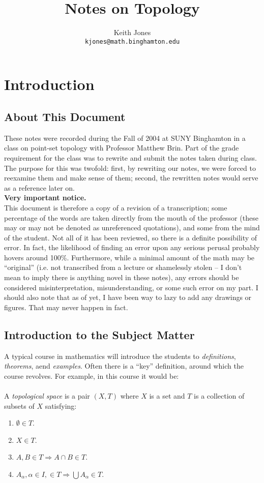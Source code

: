 \documentclass[12pt]{report}
\title{
Notes on Topology
}
\author{
    Keith Jones\\
    {\tt kjones@math.binghamton.edu}\\
}
\newcommand{\define}{  \noindent{\sc Definition }\hspace{5pt} }
\begin{document}
\maketitle

\tableofcontents


\chapter{Introduction}

\section{About This Document}
These notes were recorded during the Fall of 2004 at SUNY Binghamton in a
class on point-set topology with Professor Matthew Brin. Part of the grade
requirement for the class was to rewrite and submit the notes taken during
class. The purpose for this was twofold: first, by rewriting our notes, we
were forced to reexamine them and make sense of them; second, the rewritten
notes would serve as a reference later on. \\

\noindent
\textbf{Very important notice.}\\
This document is therefore a copy
of a revision of a transcription; some percentage of the words are taken
directly from the mouth of the professor (these may or may not be denoted as
unreferenced quotations), and some from the mind of the
student. Not all of it has been reviewed, so there is a definite possibility
of error. In fact, the likelihood of finding an error upon any serious perusal
probably hovers around 100\%. Furthermore, while a minimal
 amount of the math may be ``original''
(i.e. not transcribed from a lecture or shamelessly stolen -- I don't mean to
imply there is anything novel in these notes), any errors should be considered
misinterpretation, misunderstanding, or some such error on my part. I should
also note that as of yet, I have been way to lazy to add any drawings or
figures. That may never happen in fact.


\section{Introduction to the Subject Matter}
A typical course in mathematics will introduce the students to {\em definitions},
{\em theorems}, aend {\em examples}. Often there is a ``key'' definition, around which the
course revolves. For example, in this course it would be:\\
\\
\define A {\em topological space} is a pair $(X, T)$ where $X$ is a set and
$T$ is a collection of subsets of $X$ satisfying: 
\begin{enumerate}
\item $\emptyset \in T$.
\item $X \in T$.
\item $A, B \in T \Rightarrow A\cap B \in T$.
\item $A_{\alpha}, \alpha \in I, \in T \Rightarrow \bigcup A_{\alpha} \in T$.
\end{enumerate}
\end{document}
